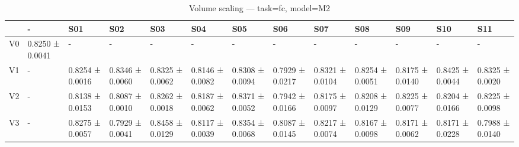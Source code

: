 \begin{table}[htbp]
\centering
\caption{Volume scaling — task=fc, model=M2}
\label{tab:volume:fc:M2}
\begin{tabular}{lllllllllllll}
\toprule
\toprule
 & - & S01 & S02 & S03 & S04 & S05 & S06 & S07 & S08 & S09 & S10 & S11 \\
\midrule
\midrule
V0 & 0.8250 ± 0.0041 & - & - & - & - & - & - & - & - & - & - & - \\
V1 & - & 0.8254 ± 0.0016 & 0.8346 ± 0.0060 & 0.8325 ± 0.0062 & 0.8146 ± 0.0082 & 0.8308 ± 0.0094 & 0.7929 ± 0.0217 & 0.8321 ± 0.0104 & 0.8254 ± 0.0051 & 0.8175 ± 0.0140 & 0.8425 ± 0.0044 & 0.8325 ± 0.0020 \\
V2 & - & 0.8138 ± 0.0153 & 0.8087 ± 0.0010 & 0.8262 ± 0.0018 & 0.8187 ± 0.0062 & 0.8371 ± 0.0052 & 0.7942 ± 0.0166 & 0.8175 ± 0.0097 & 0.8208 ± 0.0129 & 0.8225 ± 0.0077 & 0.8204 ± 0.0166 & 0.8225 ± 0.0098 \\
V3 & - & 0.8275 ± 0.0057 & 0.7929 ± 0.0041 & 0.8458 ± 0.0129 & 0.8117 ± 0.0039 & 0.8354 ± 0.0068 & 0.8087 ± 0.0145 & 0.8217 ± 0.0074 & 0.8167 ± 0.0098 & 0.8171 ± 0.0062 & 0.8171 ± 0.0228 & 0.7988 ± 0.0140 \\
\bottomrule
\end{tabular}\end{table}
